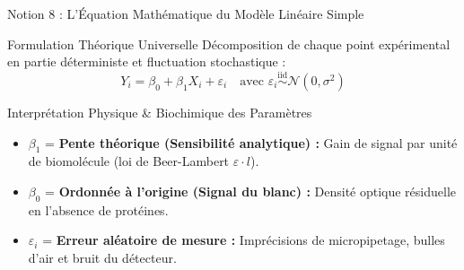 \documentclass[aspectratio=169,10pt]{beamer}
\begin{document}
\begin{frame}{Notion 8 : L'Équation Mathématique du Modèle Linéaire Simple}
  \begin{conceptbox}{Formulation Théorique Universelle}
    \footnotesize
    Décomposition de chaque point expérimental en partie déterministe et fluctuation stochastique :
    \begin{equation*}
      Y_i = \beta_0 + \beta_1 X_i + \varepsilon_i \quad \text{avec } \varepsilon_i \overset{\text{iid}}{\sim} \mathcal{N}(0, \sigma^2)
    \end{equation*}
  \end{conceptbox}
  \vspace{1mm}
  \begin{biobox}{Interprétation Physique \& Biochimique des Paramètres}
    \footnotesize
    \begin{itemize}
      \item $\beta_1$ = \textbf{Pente théorique (Sensibilité analytique) :} Gain de signal par unité de biomolécule (loi de Beer-Lambert $\varepsilon \cdot l$).
      \item $\beta_0$ = \textbf{Ordonnée à l'origine (Signal du blanc) :} Densité optique résiduelle en l'absence de protéines.
      \item $\varepsilon_i$ = \textbf{Erreur aléatoire de mesure :} Imprécisions de micropipetage, bulles d'air et bruit du détecteur.
    \end{itemize}
  \end{biobox}
\end{frame}
\end{document}
